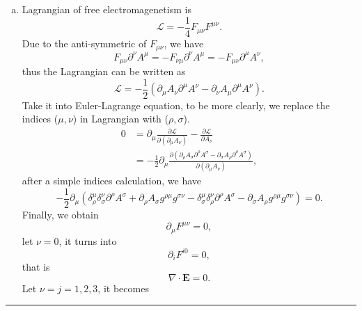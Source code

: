 \documentclass[12pt]{report}
\numberwithin{problemname}{chapter}
\newenvironment{solution}{\vspace{1em}\par\noindent{\large\textbf{\textsc{Solution}}}\par}{\vspace{1em}\hrule}
\begin{document}
\begin{solution}
\begin{enumerate}[(a)]
    \item Lagrangian of free electromagenetism is
    \begin{equation}
        \mathcal{L}=-\frac{1}{4}F_{\mu\nu}F^{\mu\nu}.
    \end{equation}
    Due to the anti-symmetric of $F_{\mu\nu}$, we have
    \begin{equation}
        F_{\mu\nu}\partial^{\nu}A^{\mu}=-F_{\nu\mu}\partial^{\nu}A^{\mu}=-F_{\mu\nu}\partial^{\mu}A^{\nu},
    \end{equation}
    thus the Lagrangian can be written as
    \begin{equation}
        \mathcal{L}=-\frac{1}{2}(\partial_{\mu}A_{\nu}\partial^{\mu}A^{\nu}-\partial_{\nu}A_{\mu}\partial^{\mu}A^{\nu}).
    \end{equation}
    Take it into Euler-Lagrange equation, to be more clearly, we replace the indices ($\mu, \nu$) in Lagrangian with ($\rho, \sigma$).
    \begin{align}
        0&=\partial_{\mu}\frac{\partial\mathcal{L}}{\partial(\partial_{\mu}A_{\nu})}-\frac{\partial\mathcal{L}}{\partial A_{\nu}} \nonumber \\
        &=-\frac{1}{2}\partial_{\mu}\frac{\partial(\partial_{\rho}A_{\sigma}\partial^{\rho}A^{\sigma}-\partial_{\sigma}A_{\rho}\partial^{\rho}A^{\sigma})}{\partial(\partial_{\mu}A_{\nu})},
    \end{align}
    after a simple indices calculation, we have
    \begin{equation}
        -\frac{1}{2}\partial_{\mu}(\delta_{\rho}^{\mu}\delta_{\sigma}^{\nu}\partial^{\rho}A^{\sigma}+\partial_{\rho}A_{\sigma}g^{\rho\mu}g^{\sigma\nu}-\delta_{\sigma}^{\mu}\delta_{\rho}^{\nu}\partial^{\rho}A^{\sigma}-\partial_{\sigma}A_{\rho}g^{\rho\mu}g^{\sigma\nu})=0.
    \end{equation}
    Finally, we obtain
    \begin{equation}
        \partial_{\mu}F^{\mu\nu}=0,
    \end{equation}
    let $\nu=0$, it turns into
    \begin{equation}
        \partial_{i}F^{i0}=0,
    \end{equation}
    that is
    \begin{equation}
        \nabla\cdot\mathbf{E}=0.
    \end{equation}
    Let $\nu=j=1,2,3$, it becomes
    \begin{equation}

\end{equation}
\end{enumerate}
\end{solution}
\end{document}
